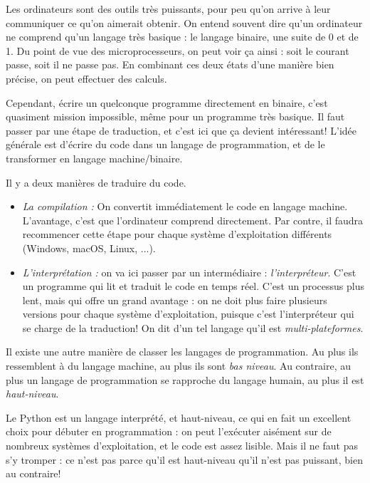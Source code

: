 Les ordinateurs sont des outils très puissants, pour peu qu'on arrive à leur communiquer ce qu'on aimerait obtenir. On entend souvent dire qu'un ordinateur ne comprend qu'un langage très basique : le langage binaire, une suite de 0 et de 1. Du point de vue des microprocesseurs, on peut voir ça ainsi : soit le courant passe, soit il ne passe pas. En combinant ces deux états d'une manière bien précise, on peut effectuer des calculs.

Cependant, écrire un quelconque programme directement en binaire, c'est quasiment mission impossible, même pour un programme très basique. Il faut passer par une étape de traduction, et c'est ici que ça devient intéressant! L'idée générale est d'écrire du code dans un langage de programmation, et de le transformer en langage machine/binaire.

Il y a deux manières de traduire du code.
\begin{itemize}
    \item \emph{La compilation :} On convertit immédiatement le code en langage machine. L'avantage, c'est que l'ordinateur comprend directement. Par contre, il faudra recommencer cette étape pour chaque système d'exploitation différents (Windows, macOS, Linux, ...).
    \item \emph{L'interprétation :} on va ici passer par un intermédiaire : \textit{l'interpréteur}. C'est un programme qui lit et traduit le code en temps réel. C'est un processus plus lent, mais qui offre un grand avantage : on ne doit plus faire plusieurs versions pour chaque système d'exploitation, puisque c'est l'interpréteur qui se charge de la traduction! On dit d'un tel langage qu'il est \textit{multi-plateformes}.
\end{itemize}


Il existe une autre manière de classer les langages de programmation. Au plus ils ressemblent à du langage machine, au plus ils sont \textit{bas niveau}. Au contraire, au plus un langage de programmation se rapproche du langage humain, au plus il est \textit{haut-niveau}.

Le Python est un langage interprété, et haut-niveau, ce qui en fait un excellent choix pour débuter en programmation : on peut l'exécuter aisément sur de nombreux systèmes d'exploitation, et le code est assez lisible. Mais il ne faut pas s'y tromper : ce n'est pas parce qu'il est haut-niveau qu'il n'est pas puissant, bien au contraire! 